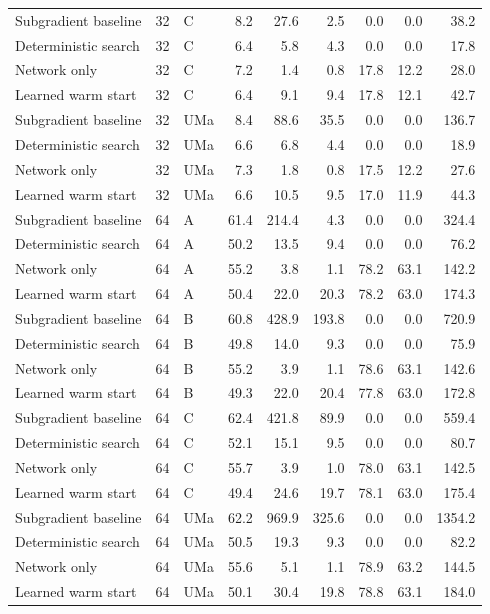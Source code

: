 \begin{longtable}{lrlrrrrrr}
Subgradient baseline & 32 & C & 8.2 & 27.6 & 2.5 & 0.0 & 0.0 & 38.2\\
Deterministic search & 32 & C & 6.4 & 5.8 & 4.3 & 0.0 & 0.0 & 17.8\\
Network only & 32 & C & 7.2 & 1.4 & 0.8 & 17.8 & 12.2 & 28.0\\
Learned warm start & 32 & C & 6.4 & 9.1 & 9.4 & 17.8 & 12.1 & 42.7\\
Subgradient baseline & 32 & UMa & 8.4 & 88.6 & 35.5 & 0.0 & 0.0 & 136.7\\
Deterministic search & 32 & UMa & 6.6 & 6.8 & 4.4 & 0.0 & 0.0 & 18.9\\
Network only & 32 & UMa & 7.3 & 1.8 & 0.8 & 17.5 & 12.2 & 27.6\\
Learned warm start & 32 & UMa & 6.6 & 10.5 & 9.5 & 17.0 & 11.9 & 44.3\\
Subgradient baseline & 64 & A & 61.4 & 214.4 & 4.3 & 0.0 & 0.0 & 324.4\\
Deterministic search & 64 & A & 50.2 & 13.5 & 9.4 & 0.0 & 0.0 & 76.2\\
Network only & 64 & A & 55.2 & 3.8 & 1.1 & 78.2 & 63.1 & 142.2\\
Learned warm start & 64 & A & 50.4 & 22.0 & 20.3 & 78.2 & 63.0 & 174.3\\
Subgradient baseline & 64 & B & 60.8 & 428.9 & 193.8 & 0.0 & 0.0 & 720.9\\
Deterministic search & 64 & B & 49.8 & 14.0 & 9.3 & 0.0 & 0.0 & 75.9\\
Network only & 64 & B & 55.2 & 3.9 & 1.1 & 78.6 & 63.1 & 142.6\\
Learned warm start & 64 & B & 49.3 & 22.0 & 20.4 & 77.8 & 63.0 & 172.8\\
Subgradient baseline & 64 & C & 62.4 & 421.8 & 89.9 & 0.0 & 0.0 & 559.4\\
Deterministic search & 64 & C & 52.1 & 15.1 & 9.5 & 0.0 & 0.0 & 80.7\\
Network only & 64 & C & 55.7 & 3.9 & 1.0 & 78.0 & 63.1 & 142.5\\
Learned warm start & 64 & C & 49.4 & 24.6 & 19.7 & 78.1 & 63.0 & 175.4\\
Subgradient baseline & 64 & UMa & 62.2 & 969.9 & 325.6 & 0.0 & 0.0 & 1354.2\\
Deterministic search & 64 & UMa & 50.5 & 19.3 & 9.3 & 0.0 & 0.0 & 82.2\\
Network only & 64 & UMa & 55.6 & 5.1 & 1.1 & 78.9 & 63.2 & 144.5\\
Learned warm start & 64 & UMa & 50.1 & 30.4 & 19.8 & 78.8 & 63.1 & 184.0\\\end{longtable}\endgroup
